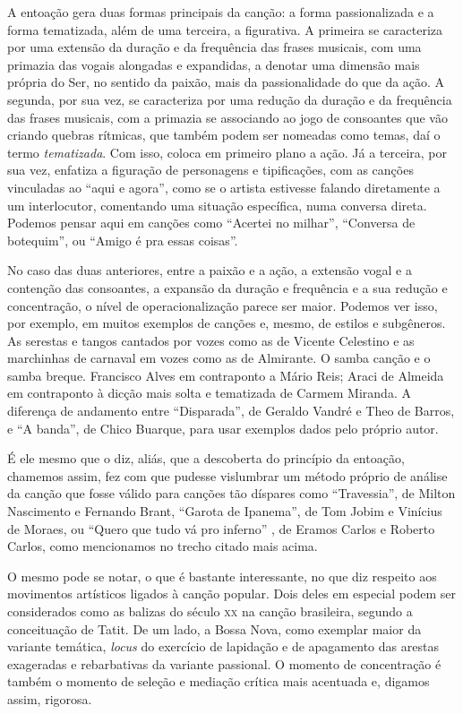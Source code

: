 A entoação gera duas formas principais da canção: a forma passionalizada
e a forma tematizada, além de uma terceira, a figurativa. A primeira se
caracteriza por uma extensão da duração e da frequência das frases
musicais, com uma primazia das vogais alongadas e expandidas, a denotar
uma dimensão mais própria do Ser, no sentido da paixão, mais da
passionalidade do que da ação. A segunda, por sua vez, se caracteriza
por uma redução da duração e da frequência das frases musicais, com a
primazia se associando ao jogo de consoantes que vão criando quebras
rítmicas, que também podem ser nomeadas como temas, daí o termo
\textit{tematizada}. Com isso, coloca em primeiro plano a ação. Já a terceira,
por sua vez, enfatiza a figuração de personagens e tipificações, com as
canções vinculadas ao ``aqui e agora'', como se o artista estivesse
falando diretamente a um interlocutor, comentando uma situação
específica, numa conversa direta. Podemos pensar aqui em canções como
``Acertei no milhar'', ``Conversa de botequim'', ou ``Amigo é pra essas
coisas''.

No caso das duas anteriores, entre a paixão e a ação, a extensão vogal e
a contenção das consoantes, a expansão da duração e frequência e a sua
redução e concentração, o nível de operacionalização parece ser maior.
Podemos ver isso, por exemplo, em muitos exemplos de canções e, mesmo,
de estilos e subgêneros. As serestas e tangos cantados por vozes como as
de Vicente Celestino e as marchinhas de carnaval em vozes como as de
Almirante. O samba canção e o samba breque. Francisco Alves em
contraponto a Mário Reis; Araci de Almeida em contraponto à dicção mais
solta e tematizada de Carmem Miranda. A diferença de andamento entre
``Disparada'', de Geraldo Vandré e Theo de Barros, e ``A banda'', de Chico Buarque,
para usar exemplos dados pelo próprio autor.

É ele mesmo que o diz, aliás, que a descoberta do princípio da entoação,
chamemos assim, fez com que pudesse vislumbrar um método próprio de
análise da canção que fosse válido para canções tão díspares como
``Travessia'', de Milton Nascimento e Fernando Brant, ``Garota de Ipanema'', de Tom Jobim e Vinícius de Moraes, ou ``Quero que tudo vá pro inferno''
, de Eramos Carlos e Roberto Carlos, como mencionamos no trecho citado mais
acima.

O mesmo pode se notar, o que é bastante interessante, no que diz
respeito aos movimentos artísticos ligados à canção popular. Dois deles
em especial podem ser considerados como as balizas do século \textsc{xx} na
canção brasileira, segundo a conceituação de Tatit. De um lado, a Bossa
Nova, como exemplar maior da variante temática, \emph{locus} do
exercício de lapidação e de apagamento das arestas exageradas e
rebarbativas da variante passional. O momento de concentração é também o
momento de seleção e mediação crítica mais acentuada e, digamos assim,
rigorosa.

